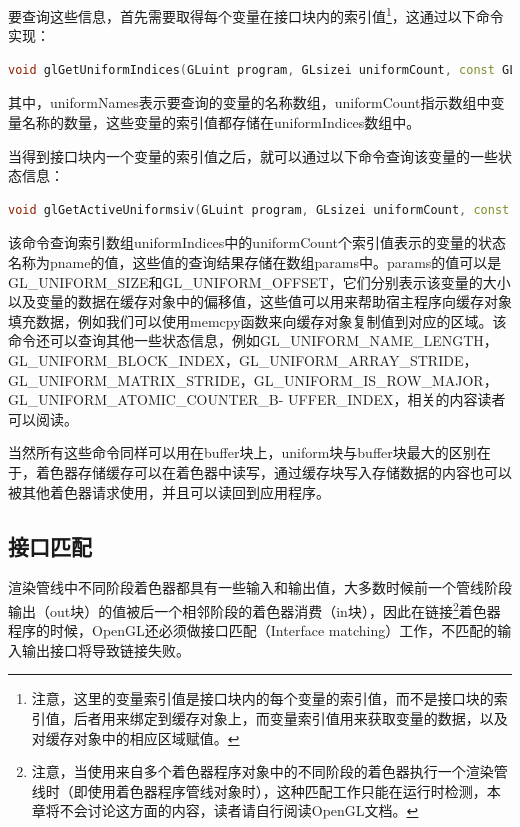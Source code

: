 要查询这些信息，首先需要取得每个变量在接口块内的索引值\footnote{注意，这里的变量索引值是接口块内的每个变量的索引值，而不是接口块的索引值，后者用来绑定到缓存对象上，而变量索引值用来获取变量的数据，以及对缓存对象中的相应区域赋值。}，这通过以下命令实现：

\begin{lstlisting}[language=C++]
void glGetUniformIndices(GLuint program​, GLsizei uniformCount​, const GLchar **uniformNames​, GLuint *uniformIndices​);
\end{lstlisting}

其中，uniformNames表示要查询的变量的名称数组，uniformCount指示数组中变量名称的数量，这些变量的索引值都存储在uniformIndices数组中。

当得到接口块内一个变量的索引值之后，就可以通过以下命令查询该变量的一些状态信息：

\begin{lstlisting}[language=C++]
void glGetActiveUniformsiv(GLuint program​, GLsizei uniformCount​, const GLuint *uniformIndices​, GLenum pname​, GLint *params​);
\end{lstlisting}

该命令查询索引数组uniformIndices中的uniformCount个索引值表示的变量的状态名称为pname的值，这些值的查询结果存储在数组params中。params的值可以是GL\_UNIFORM\_SIZE和GL\_UNIFORM\_OFFSET，它们分别表示该变量的大小以及变量的数据在缓存对象中的偏移值，这些值可以用来帮助宿主程序向缓存对象填充数据，例如我们可以使用memcpy函数来向缓存对象复制值到对应的区域。该命令还可以查询其他一些状态信息，例如GL\_UNIFORM\_NAME\_LENGTH，GL\_UNIFORM\_BLOCK\_INDEX，GL\_UNIFORM\_ARRAY\_STRIDE，GL\_UNIFORM\_MATRIX\_STRIDE，GL\_UNIFORM\_IS\_ROW\_MAJOR，GL\_UNIFORM\_ATOMIC\_COUNTER\_B- UFFER\_INDEX，相关的内容读者可以阅读\cite{b:OpenGL4.5CoreProfile}。

当然所有这些命令同样可以用在buffer块上，uniform块与buffer块最大的区别在于，着色器存储缓存可以在着色器中读写，通过缓存块写入存储数据的内容也可以被其他着色器请求使用，并且可以读回到应用程序。





\subsection{接口匹配}
渲染管线中不同阶段着色器都具有一些输入和输出值，大多数时候前一个管线阶段输出（out块）的值被后一个相邻阶段的着色器消费（in块），因此在链接\footnote{注意，当使用来自多个着色器程序对象中的不同阶段的着色器执行一个渲染管线时（即使用着色器程序管线对象时），这种匹配工作只能在运行时检测，本章将不会讨论这方面的内容，读者请自行阅读OpenGL文档。}着色器程序的时候，OpenGL还必须做接口匹配（Interface matching）工作，不匹配的输入输出接口将导致链接失败。

